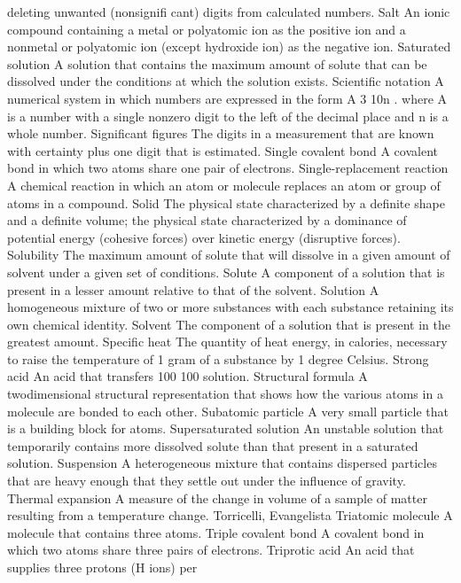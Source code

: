 \documentclass[10pt, roman]{article}
\begin{document}
deleting unwanted (nonsignifi cant) digits from calculated numbers. Salt An ionic compound containing a metal or polyatomic ion as the positive ion and a nonmetal or polyatomic ion (except hydroxide ion) as the 
negative ion. Saturated solution A solution that contains the maximum amount of solute that can be dissolved under the conditions at which the solution exists. Scientific notation A numerical system in which numbers 
are expressed in the form A 3 10n . where A is a number with a single nonzero digit to the left of the decimal place and n is a whole number. Significant figures The digits in a measurement that are known with 
certainty plus one digit that is estimated. Single covalent bond A covalent bond in which two atoms share one pair of electrons. Single-replacement reaction A chemical reaction in which an atom or molecule replaces 
an atom or group of atoms in a compound. Solid The physical state characterized by a definite shape and a definite volume; the physical state characterized by a dominance of potential energy (cohesive forces) over 
kinetic energy (disruptive forces). Solubility The maximum amount of solute that will dissolve in a given amount of solvent under a given set of conditions. Solute A component of a solution that is present in a 
lesser amount relative to that of the solvent. Solution A homogeneous mixture of two or more substances with each substance retaining its own chemical identity. Solvent The component of a solution that is present in 
the greatest amount. Specific heat The quantity of heat energy, in calories, necessary to raise the temperature of 1 gram of a substance by 1 degree Celsius. Strong acid An acid that transfers 100%
100%
solution. Structural formula A twodimensional structural representation that shows how the various atoms in a molecule are bonded to each other. Subatomic particle A very small particle that is a building block 
for atoms. Supersaturated solution An unstable solution that temporarily contains more dissolved solute than that present in a saturated solution. Suspension A heterogeneous mixture that contains dispersed particles 
that are heavy enough that they settle out under the influence of gravity. Thermal expansion A measure of the change in volume of a sample of matter resulting from a temperature change. Torricelli, Evangelista 
Triatomic molecule A molecule that contains three atoms. Triple covalent bond A covalent bond in which two atoms share three pairs of electrons. Triprotic acid An acid that supplies three protons (H ions) per 
\end{document}
